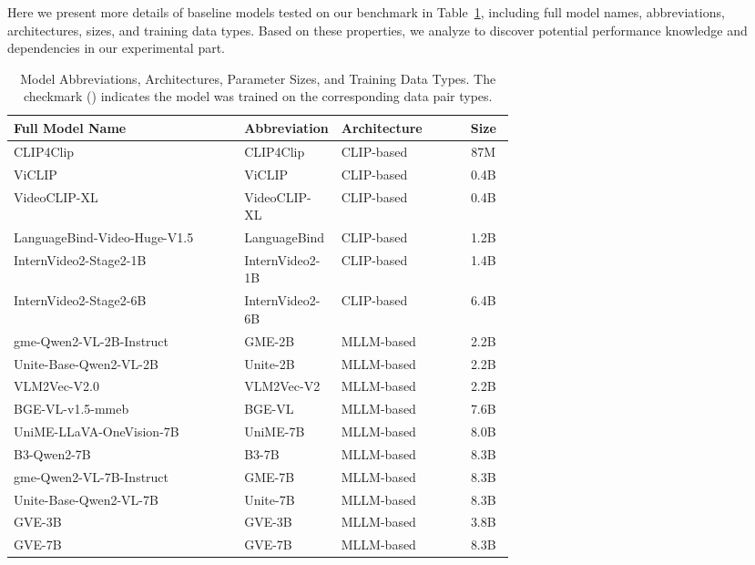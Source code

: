 Here we present more details of baseline models tested on our benchmark in Table~\ref{gve:tab:models}, including full model names, abbreviations, architectures, sizes, and training data types. Based on these properties, we analyze to discover potential performance knowledge and dependencies in our experimental part.

\begin{table}[t]
\centering
\caption{Model Abbreviations, Architectures, Parameter Sizes, and Training Data Types. The checkmark (\checkmark) indicates the model was trained on the corresponding data pair types.}
\label{gve:tab:models}
\footnotesize
\begin{tabular}{@{}p{0.46\linewidth}p{0.18\linewidth}lc@{}}
\toprule
\textbf{Full Model Name} & \textbf{Abbreviation} & \textbf{Architecture} & \textbf{Size} \\
\midrule
CLIP4Clip & CLIP4Clip & CLIP-based & 87M \\
ViCLIP & ViCLIP & CLIP-based & 0.4B \\
VideoCLIP-XL & VideoCLIP-XL & CLIP-based & 0.4B \\
LanguageBind-Video-Huge-V1.5 & LanguageBind & CLIP-based & 1.2B \\
InternVideo2-Stage2-1B & InternVideo2-1B & CLIP-based & 1.4B \\
InternVideo2-Stage2-6B & InternVideo2-6B & CLIP-based & 6.4B \\
\midrule
gme-Qwen2-VL-2B-Instruct & GME-2B & MLLM-based & 2.2B \\
Unite-Base-Qwen2-VL-2B & Unite-2B & MLLM-based & 2.2B \\
VLM2Vec-V2.0 & VLM2Vec-V2 & MLLM-based & 2.2B \\
BGE-VL-v1.5-mmeb & BGE-VL & MLLM-based & 7.6B \\
UniME-LLaVA-OneVision-7B & UniME-7B & MLLM-based & 8.0B \\
B3-Qwen2-7B & B3-7B & MLLM-based & 8.3B \\
gme-Qwen2-VL-7B-Instruct & GME-7B & MLLM-based & 8.3B \\
Unite-Base-Qwen2-VL-7B & Unite-7B & MLLM-based & 8.3B \\
\midrule
GVE-3B & GVE-3B & MLLM-based & 3.8B \\
GVE-7B & GVE-7B & MLLM-based & 8.3B \\
\bottomrule
\end{tabular}


\end{table}
